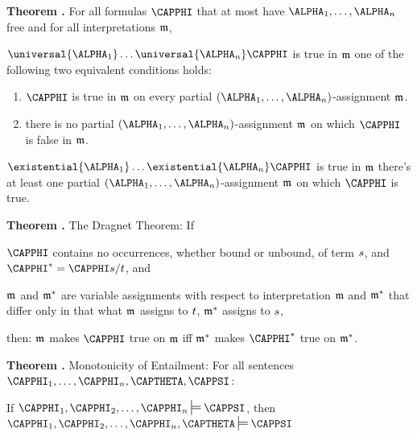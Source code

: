 \begin{majorILnc}{\textbf{Theorem .}}
For all \GQL{} formulas $\CAPPHI$ that at most have $\ALPHA_1,\ldots,\ALPHA_{\integer{n}}$ free and for all interpretations $\mathfrak{m}$, 
\begin{cenumerate}
\item $\universal{\ALPHA_1}\ldots\universal{\ALPHA_{\integer{n}}}\CAPPHI$ is true in $\mathfrak{m}$ \Iff one of the following two equivalent conditions holds:
\begin{enumerate}
\item $\CAPPHI$ is true in $\mathfrak{m}$ on every partial $(\ALPHA_1,\ldots,\ALPHA_{\integer{n}})$-assignment $\mathfrak{m^{\mathrm{}}_{\mathrm{}}}$.
\item there is no partial $(\ALPHA_1,\ldots,\ALPHA_{\integer{n}})$-assignment $\mathfrak{m^{\mathrm{}}_{\mathrm{}}}$ on which $\CAPPHI$ is false in $\mathfrak{m}$.
\end{enumerate}
\item $\existential{\ALPHA_1}\ldots\existential{\ALPHA_{\integer{n}}}\CAPPHI$ is true in $\mathfrak{m}$ \Iff there's at least one partial $(\ALPHA_1,\ldots,\ALPHA_{\integer{n}})$-assignment $\mathfrak{m^{\mathrm{}}_{\mathrm{}}}$ on which $\CAPPHI$ is true.
\end{cenumerate}
\end{majorILnc}


\begin{majorILnc}{\textbf{Theorem .} The Dragnet Theorem:}
If 
\begin{cenumerate}
\item $\CAPPHI$ contains no occurrences, whether bound or unbound, of term $s$, and $\CAPPHI^*=\CAPPHI\variable{s}/\variable{t}$, and
\item $\mathfrak{m^{\mathrm{}}_{\mathrm{}}}$ and $\mathfrak{m^{\mathrm{*}}_{\mathrm{}}}$ are variable assignments with respect to interpretation $\mathfrak{m}$ and $\mathfrak{m}^*$ that differ only in that what $\mathfrak{m^{\mathrm{}}_{\mathrm{}}}$ assigns to $t$, $\mathfrak{m^{\mathrm{*}}_{\mathrm{}}}$ assigns to $s$,
\end{cenumerate} 
then: $\mathfrak{m^{\mathrm{}}_{\mathrm{}}}$ makes $\CAPPHI$ true on $\mathfrak{m}$ iff $\mathfrak{m^{\mathrm{*}}_{\mathrm{}}}$ makes $\CAPPHI^*$ true on $\mathfrak{m}^*$.
\end{majorILnc}

\begin{majorILnc}{\textbf{Theorem .} Monotonicity of Entailment:}
For all \GSL{} sentences $\CAPPHI_1,\ldots,\CAPPHI_{\integer{n}},\CAPTHETA,\CAPPSI$:
\begin{center}
If $\CAPPHI_1,\CAPPHI_2,\ldots,\CAPPHI_{\integer{n}}\sdtstile{}{}\CAPPSI$, then $\CAPPHI_1,\CAPPHI_2,\ldots,\CAPPHI_{\integer{n}},\CAPTHETA\sdtstile{}{}\CAPPSI$
\end{center}
\end{majorILnc}

